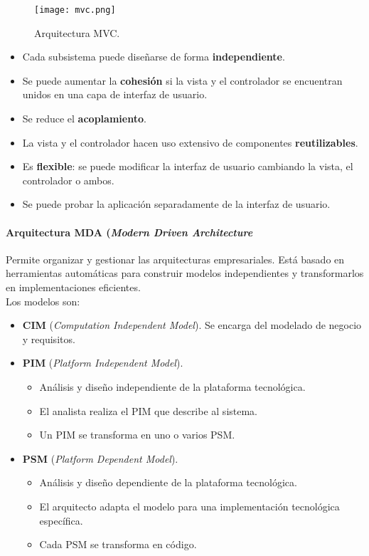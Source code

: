 \documentclass[12pt,spanish]{article}
\begin{document}
\begin{figure}[H]
\centering
\texttt{[image: mvc.png]}
\caption{Arquitectura MVC.}
\end{figure}

\begin{itemize}
	\item Cada subsistema puede diseñarse de forma \textbf{independiente}.
	\item Se puede aumentar la \textbf{cohesión} si la vista y el controlador se encuentran unidos en una capa de interfaz de usuario.
	\item Se reduce el \textbf{acoplamiento}.
	\item La vista y el controlador hacen uso extensivo de componentes \textbf{reutilizables}.
	\item Es \textbf{flexible}: se puede modificar la interfaz de usuario cambiando la vista, el controlador o ambos.
	\item Se puede probar la aplicación separadamente de la interfaz de usuario.
\end{itemize}

\newpage

\paragraph{Arquitectura MDA (\textit{Modern Driven Architecture}\\}

Permite organizar y gestionar las arquitecturas empresariales. Está basado en herramientas automáticas para construir modelos independientes y transformarlos en implementaciones eficientes.\\

Los modelos son:

\begin{itemize}
	\item \textbf{CIM} (\textit{Computation Independent Model}). Se encarga del modelado de negocio y requisitos.
	\item \textbf{PIM} (\textit{Platform Independent Model}).
		\begin{itemize}
			\item Análisis y diseño independiente de la plataforma tecnológica.
			\item El analista realiza el PIM que describe al sistema.
			\item Un PIM se transforma en uno o varios PSM.
		\end{itemize}
		\item \textbf{PSM} (\textit{Platform Dependent Model}).
			\begin{itemize}
			\item Análisis y diseño dependiente de la plataforma tecnológica.
			\item El arquitecto adapta el modelo para una implementación tecnológica específica.
			\item Cada PSM se transforma en código.
		\end{itemize}
\end{itemize}
\end{document}
